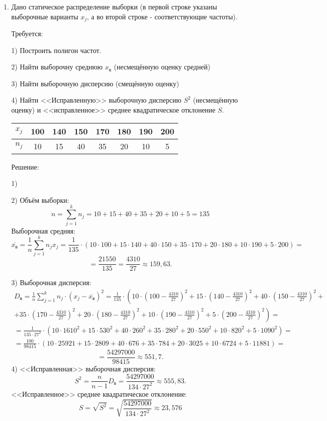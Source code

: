 \documentclass{article}
\begin{document}
\begin{enumerate}
\item %
Дано статическое распределение выборки (в первой строке указаны выборочные варианты $x_j$, а во второй строке - соответствующие частоты).

Требуется:

1) Построить полигон частот.

2) Найти выборочну среднюю $x_\textit{в}$ (несмещённую оценку средней)

3) Найти выборочную дисперсию (смещённую оценку)

4) Найти <<Исправленную>> выборочную дисперсию $S^2$ (несмещённую оценку) и <<исправленное>> среднее квадратическое отклонение $S$.

\begin{center}
\begin{tabular}{|c|c|c|c|c|c|c|c|}
\hline
$x_j$ & 100 & 140 & 150 & 170 & 180 & 190 & 200 \\
\hline
$n_j$ & 10 & 15 & 40 & 35 & 20 & 10 & 5 \\
\hline
\end{tabular}
\end{center}
\begin{center}Решение:\end{center}
1)

2) Объём выборки: $$n=\sum_{j=1}^k n_j=10+15+40+35+20+10+5=135$$
Выборочная средняя:
$$\overline{x_\textit{в}}=\frac{1}{n}\sum_{j=1}^k n_j x_j=\frac{1}{135}\cdot\left(10\cdot100+15\cdot140+40\cdot150+35\cdot170+20\cdot180+10\cdot190+5\cdot200\right)=$$
$$=\frac{21550}{135}=\frac{4310}{27}\approx159,63.$$

3) Выборочная дисперсия:
\begin{multline*}
D_{\textit{в}}=\frac{1}{n}\sum_{j=1}^k n_j
\cdot\left(x_j-\overline{x_\textit{в}}\right)^2=
\frac{1}{135}\cdot\left(10\cdot\left(100-\frac{4310}{27}\right)^2+15\cdot\left(140-\frac{4310}{27}\right)^2+40\cdot\left(150-\frac{4310}{27}\right)^2+\right.\\
+\left.35\cdot\left(170-\frac{4310}{27}\right)^2+20\cdot\left(180-\frac{4310}{27}\right)^2+10\cdot\left(190-\frac{4310}{27}\right)^2+5\cdot\left(200-\frac{4310}{27}\right)^2\right)=\\
=\frac{1}{135\cdot27^2}\cdot\left(10\cdot1610^2+15\cdot530^2+40\cdot260^2+35\cdot280^2+20\cdot550^2+10\cdot820^2+5\cdot1090^2\right)=\\
=\frac{100}{98415}\cdot\left(10\cdot25921+15\cdot2809+40\cdot676+35\cdot784+20\cdot3025+10\cdot6724+5\cdot11881\right)=
\end{multline*}
$$=\frac{54297000}{98415}\approx551,7.$$
4) <<Исправленная>> выборочная дисперсия:
$$S^2=\frac{n}{n-1}D_{\textit{в}}=\frac{54297000}{134\cdot27^2}\approx555,83.$$
<<Исправленное>> среднее квадратическое отклонение:
$$S=\sqrt{S^2}=\sqrt{\frac{54297000}{134\cdot27^2}}\approx23,576$$


\end{enumerate}
\end{document}
